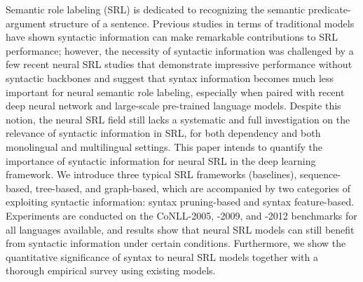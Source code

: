 Semantic role labeling (SRL) is dedicated to recognizing the semantic predicate-argument structure of a sentence. Previous studies in terms of traditional models have shown syntactic information can make remarkable contributions to SRL performance; however, the necessity of syntactic information was challenged by a few recent neural SRL studies that demonstrate impressive performance without syntactic backbones and suggest that syntax information becomes much less important for neural semantic role labeling, especially when paired with recent deep neural network and large-scale pre-trained language models. Despite this notion, the neural SRL field still lacks a systematic and full investigation on the relevance of syntactic information in SRL, for both dependency and both monolingual and multilingual settings. This paper intends to quantify the importance of syntactic information for neural SRL in the deep learning framework. We introduce three typical SRL frameworks (baselines), sequence-based, tree-based, and graph-based, which are accompanied by two categories of exploiting syntactic information: syntax pruning-based and syntax feature-based. Experiments are conducted on the CoNLL-2005, -2009, and -2012 benchmarks for all languages available, and results show that neural SRL models can still benefit from syntactic information under certain conditions. Furthermore, we show the quantitative significance of syntax to neural SRL models together with a thorough empirical survey using existing models.